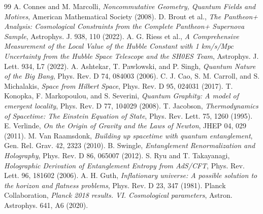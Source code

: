\documentclass[onecolumn,PRD,amsmath,amssymb,aps,nofootinbib,superscriptaddress,11pt]{revtex4-2}
\begin{document}
\begin{thebibliography}{99}
A. Connes and M. Marcolli, \textit{Noncommutative Geometry, Quantum Fields and Motives}, American Mathematical Society (2008).
D. Brout et al., \textit{The Pantheon+ Analysis: Cosmological Constraints from the Complete Pantheon+ Supernova Sample}, Astrophys. J. 938, 110 (2022).
A. G. Riess et al., \textit{A Comprehensive Measurement of the Local Value of the Hubble Constant with 1 km/s/Mpc Uncertainty from the Hubble Space Telescope and the SH0ES Team}, Astrophys. J. Lett. 934, L7 (2022).
A. Ashtekar, T. Pawlowski, and P. Singh, \textit{Quantum Nature of the Big Bang}, Phys. Rev. D 74, 084003 (2006).
C. J. Cao, S. M. Carroll, and S. Michalakis, \textit{Space from Hilbert Space}, Phys. Rev. D 95, 024031 (2017).
T. Konopka, F. Markopoulou, and S. Severini, \textit{Quantum Graphity: A model of emergent locality}, Phys. Rev. D 77, 104029 (2008).
T. Jacobson, \textit{Thermodynamics of Spacetime: The Einstein Equation of State}, Phys. Rev. Lett. 75, 1260 (1995).
E. Verlinde, \textit{On the Origin of Gravity and the Laws of Newton}, JHEP 04, 029 (2011).
M. Van Raamsdonk, \textit{Building up spacetime with quantum entanglement}, Gen. Rel. Grav. 42, 2323 (2010).
B. Swingle, \textit{Entanglement Renormalization and Holography}, Phys. Rev. D 86, 065007 (2012).
S. Ryu and T. Takayanagi, \textit{Holographic Derivation of Entanglement Entropy from AdS/CFT}, Phys. Rev. Lett. 96, 181602 (2006).
A. H. Guth, \textit{Inflationary universe: A possible solution to the horizon and flatness problems}, Phys. Rev. D 23, 347 (1981).
Planck Collaboration, \textit{Planck 2018 results. VI. Cosmological parameters}, Astron. Astrophys. 641, A6 (2020).
\end{thebibliography}
\end{document}
